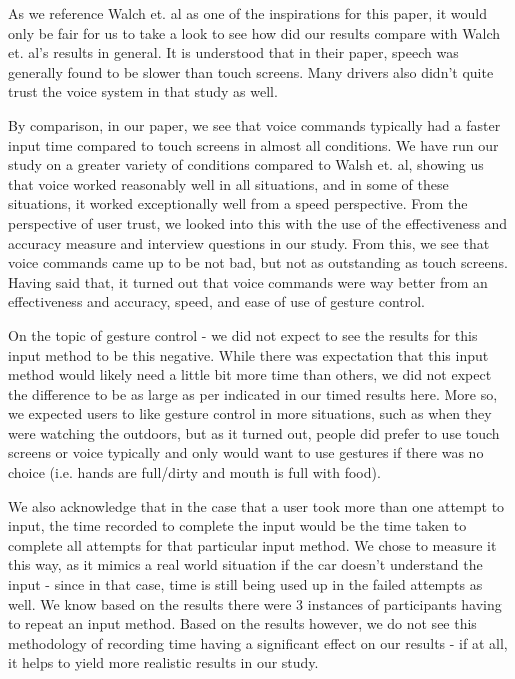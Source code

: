 \documentclass{sigchi}
\begin{document}
As we reference Walch et. al \cite{Walch2016} as one of the inspirations for this paper, it would only be fair for us to take a look to see how did our results compare with Walch et. al's results in general. It is understood that in their paper, speech was generally found to be slower than touch screens. Many drivers also didn't quite trust the voice system in that study as well.

By comparison, in our paper, we see that voice commands typically had a faster input time compared to touch screens in almost all conditions. We have run our study on a greater variety of conditions compared to Walsh et. al, showing us that voice worked reasonably well in all situations, and in some of these situations, it worked exceptionally well from a speed perspective. From the perspective of user trust, we looked into this with the use of the effectiveness and accuracy measure and interview questions in our study. From this, we see that voice commands came up to be not bad, but not as outstanding as touch screens. Having said that, it turned out that voice commands were way better from an effectiveness and accuracy, speed, and ease of use of gesture control.

On the topic of gesture control - we did not expect to see the results for this input method to be this negative. While there was expectation that this input method would likely need a little bit more time than others, we did not expect the difference to be as large as per indicated in our timed results here. More so, we expected users to like gesture control in more situations, such as when they were watching the outdoors, but as it turned out, people did prefer to use touch screens or voice typically and only would want to use gestures if there was no choice (i.e. hands are full/dirty and mouth is full with food).

We also acknowledge that in the case that a user took more than one attempt to input, the time recorded to complete the input would be the time taken to complete all attempts for that particular input method. We chose to measure it this way, as it mimics a real world situation if the car doesn't understand the input - since in that case, time is still being used up in the failed attempts as well. We know based on the results there were 3 instances of participants having to repeat an input method. Based on the results however, we do not see this methodology of recording time having a significant effect on our results - if at all, it helps to yield more realistic results in our study.
\end{document}
